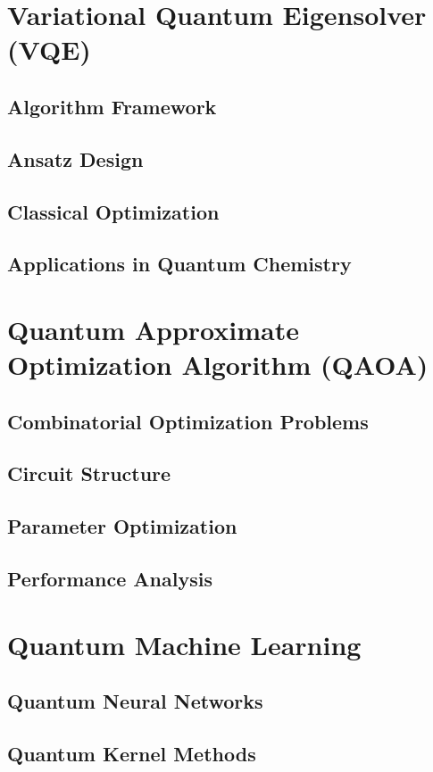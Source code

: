 \documentclass[12pt,a4paper]{book}
\begin{document}
\section{Variational Quantum Eigensolver (VQE)}
\subsection{Algorithm Framework}
\subsection{Ansatz Design}
\subsection{Classical Optimization}
\subsection{Applications in Quantum Chemistry}

\section{Quantum Approximate Optimization Algorithm (QAOA)}
\subsection{Combinatorial Optimization Problems}
\subsection{Circuit Structure}
\subsection{Parameter Optimization}
\subsection{Performance Analysis}

\section{Quantum Machine Learning}
\subsection{Quantum Neural Networks}
\subsection{Quantum Kernel Methods}
\end{document}
